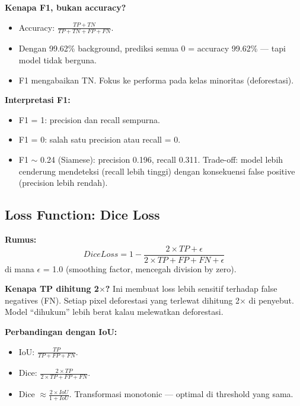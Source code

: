 \documentclass[10pt,a4paper,onecolumn]{article}
\begin{document}
\textbf{Kenapa F1, bukan accuracy?}
\begin{itemize}[nosep]
    \item Accuracy: $\frac{TP + TN}{TP + TN + FP + FN}$.
    \item Dengan 99.62\% background, prediksi semua 0 = accuracy
          99.62\% — tapi model tidak berguna.
    \item F1 mengabaikan TN. Fokus ke performa pada kelas minoritas
          (deforestasi).
\end{itemize}

\textbf{Interpretasi F1:}
\begin{itemize}[nosep]
    \item F1 = 1: precision dan recall sempurna.
    \item F1 = 0: salah satu precision atau recall = 0.
    \item F1 $\sim$ 0.24 (Siamese): precision 0.196, recall 0.311.
          Trade-off: model lebih cenderung mendeteksi (recall lebih
          tinggi) dengan konsekuensi false positive (precision lebih
          rendah).
\end{itemize}

\subsection{Loss Function: Dice Loss}

\textbf{Rumus:}
$$DiceLoss = 1 - \frac{2 \times TP + \epsilon}{2 \times TP + FP + FN + \epsilon}$$
di mana $\epsilon$ = 1.0 (smoothing factor, mencegah division by
zero).

\textbf{Kenapa TP dihitung 2$\times$?} Ini membuat loss lebih sensitif
terhadap false negatives (FN). Setiap pixel deforestasi yang terlewat
dihitung 2$\times$ di penyebut. Model ``dihukum'' lebih berat kalau
melewatkan deforestasi.

\textbf{Perbandingan dengan IoU:}
\begin{itemize}[nosep]
    \item IoU: $\frac{TP}{TP + FP + FN}$.
    \item Dice: $\frac{2 \times TP}{2 \times TP + FP + FN}$.
    \item Dice $\approx \frac{2 \times IoU}{1 + IoU}$. Transformasi
          monotonic — optimal di threshold yang sama.
\end{itemize}
\end{document}
